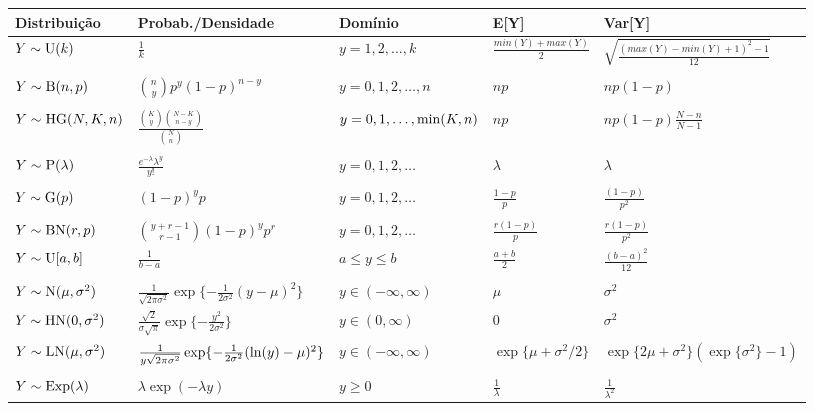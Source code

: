 \documentclass[9pt,a4paper]{extarticle}
\begin{document}

\begin{tabular}{lllll} 
\hline
Distribuição & Probab./Densidade & Domínio & E[Y] & Var[Y] \\
\hline
$Y \sim {\rm U}(k)$ & $\frac{1}{k}$ & $y=1, 2, \ldots, k$  & $\frac{min(Y) + max(Y)}{2}$ & $\sqrt{\frac{(max(Y) - min(Y) + 1)^2 -1}{12}}$  \\
\\
$Y \sim {\rm B}(n,p)$ & $\binom{n}{y} p^y (1-p)^{n-y}$ & $y=0, 1, 2, \ldots, n$ 
&  $np$ & $np(1-p)$ \\
\\
$Y \sim {\rm HG}(N, K, n)$ & $\frac{\binom{K}{y}\binom{N-K}{n-y}}{\binom{N}{n}}$ &  $y=0, 1, \ldots, {\rm min}(K,n)$ & $np$ & $np(1-p)\frac{N-n}{N-1}$ \\
\\
$Y \sim {\rm P}(\lambda)$ &  $\frac{e^{-\lambda} \lambda^y}{y!}$ & $y=0, 1, 2, \ldots$ & $\lambda$ & $\lambda$ \\
\\
$Y \sim {\rm G}(p)$ &  $(1-p)^{y}p$ & $y=0, 1, 2, \ldots$
& $\frac{1-p}{p}$ & $\frac{(1-p)}{p^2}$ \\
\\
$Y \sim {\rm BN}(r,p)$ &  $\binom{y+r-1}{r-1} (1-p)^{y} p^r$ & $y=0, 1, 2, \ldots$ 
& $\frac{r(1-p)}{p}$ & $\frac{r(1-p)}{p^2}$ \\
\hline
$Y \sim {\rm U}[a,b]$ & $\frac{1}{b-a}$ & $a \leq y \leq b$ & $\frac{a+b}{2}$ & $\frac{(b-a)^2}{12}$ \\
\\
$Y \sim {\rm N}(\mu, \sigma^2)$ &  $\frac{1}{\sqrt{2\pi\sigma^2}}\exp\{-\frac{1}{2\sigma^2}(y - \mu)^2\}$ & $y \in (-\infty, \infty)$ & $\mu$ & $\sigma^2$ \\
$Y \sim {\rm HN}(0, \sigma^2)$ &  $\frac{\sqrt{2}}{\sigma\sqrt{\pi}}\exp\{-\frac{y^2}{2\sigma^2}\} $ & $y \in (0, \infty)$ & $0$ & $\sigma^2$ \\
$Y \sim {\rm LN}(\mu, \sigma^2)$ &  $\frac{1}{y \sqrt{2\pi\sigma^2}}\exp\{-\frac{1}{2\sigma^2}({\rm ln}(y) - \mu)^2\}$ & $y \in (-\infty, \infty)$ & $ \exp\{\mu + \sigma^2/2\}$ & $\exp\{2\mu + \sigma^2\}(\exp\{\sigma^2\} -1)$ \\
\\
$Y \sim {\rm Exp}(\lambda)$ & $ \lambda\exp(-\lambda y)$ & $y \geq 0$ & $\frac{1}{\lambda}$ & $\frac{1}{\lambda^2}$ \\

\end{tabular}
\end{document}
